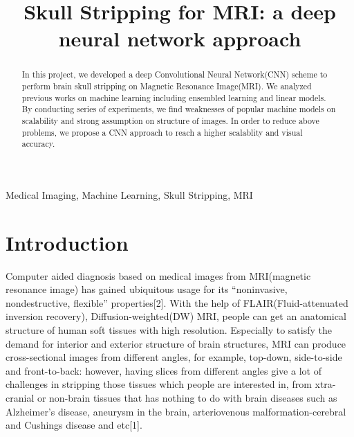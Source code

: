 \documentclass[conference]{IEEEtran}
\begin{document}
\title{Skull Stripping for MRI: a deep neural network approach}

\author{
\and
{}
}

\maketitle

\begin{abstract}
In this project, we developed a deep Convolutional Neural Network(CNN) scheme to perform brain skull stripping on Magnetic Resonance Image(MRI). We analyzed previous works on machine learning including ensembled learning and linear models. By conducting series of experiments, we find weaknesses of popular machine models on scalability and strong assumption on structure of images. In order to reduce above problems, we propose a CNN approach to reach a higher scalablity and visual accuracy. 

\end{abstract}

\begin{IEEEkeywords}
Medical Imaging, Machine Learning, Skull Stripping, MRI
\end{IEEEkeywords}

\section{Introduction}
Computer aided diagnosis based on medical images from MRI(magnetic resonance image) has gained ubiquitous usage for its “noninvasive, nondestructive, flexible” properties[2]. With the help of FLAIR(Fluid-attenuated inversion recovery), Diffusion-weighted(DW) MRI, people can get an anatomical structure of human soft tissues with high resolution. Especially to satisfy the demand for interior and exterior structure of brain structures, MRI can produce cross-sectional images from different angles, for example, top-down, side-to-side and front-to-back: however, having slices from different angles give a lot of challenges in stripping those tissues which people are interested in, from xtra-cranial or non-brain tissues that has nothing to do with brain diseases such as Alzheimer’s disease, aneurysm in the brain, arteriovenous malformation-cerebral and Cushings disease and etc[1]. 
\end{document}
